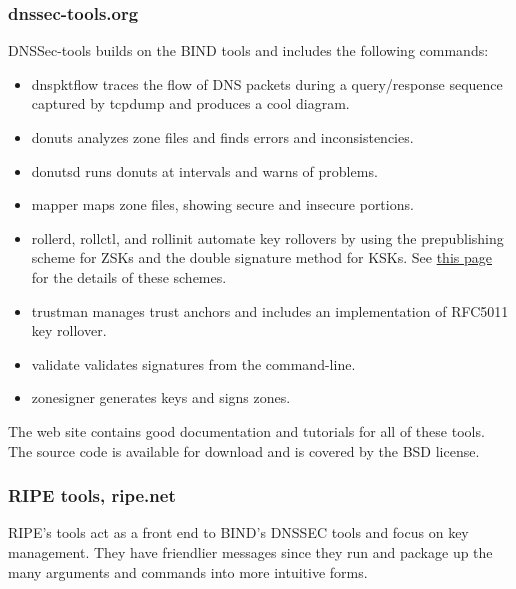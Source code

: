 \subsubsection[dnssec-tools.org]{\texorpdfstring{\protect\hypertarget{part0024_split_067.htmlux5cux23_idTextAnchor950}{}{}dnssec-tools.org}{dnssec-tools.org}}

DNSSec-tools builds on the BIND tools and includes the following
commands:

\begin{itemize}
\tightlist
\item
  {dnspktflow} traces the flow of DNS packets during a query/response
  sequence captured by {tcpdump} and produces a cool diagram.
\item
  {donuts} analyzes zone files and finds errors and inconsistencies.
\item
  {donutsd} runs {donuts} at intervals and warns of problems.
\item
  {mapper} maps zone files, showing secure and insecure portions.
\item
  {rollerd}, {rollctl}, and {rollinit} automate key rollovers by using
  the prepublishing scheme for ZSKs and the double signature method for
  KSKs. See
  \protect\hyperlink{part0024_split_066.htmlux5cux23_idTextAnchor947}{this
  page} for the details of these schemes.
\item
  {trustman} manages trust anchors and includes an implementation of
  RFC5011 key rollover.
\item
  {validate} validates signatures from the command-line.
\item
  {zonesigner} generates keys and signs zones.
\end{itemize}

The web site contains good documentation and tutorials for all of these
tools. The source code is available for download and is covered by the
BSD license.

\subsubsection[RIPE tools,
ripe.net]{\texorpdfstring{\protect\hypertarget{part0024_split_067.htmlux5cux23_idTextAnchor951}{}{}RIPE
tools, ripe.net}{RIPE tools, ripe.net}}

\protect\hypertarget{part0024_split_067.htmlux5cux23_idIndexMarker2276}{}{}RIPE's
tools act as a front end to BIND's DNSSEC tools and focus on key
management. They have friendlier messages since they run and package up
the many arguments and commands into more intuitive forms.

